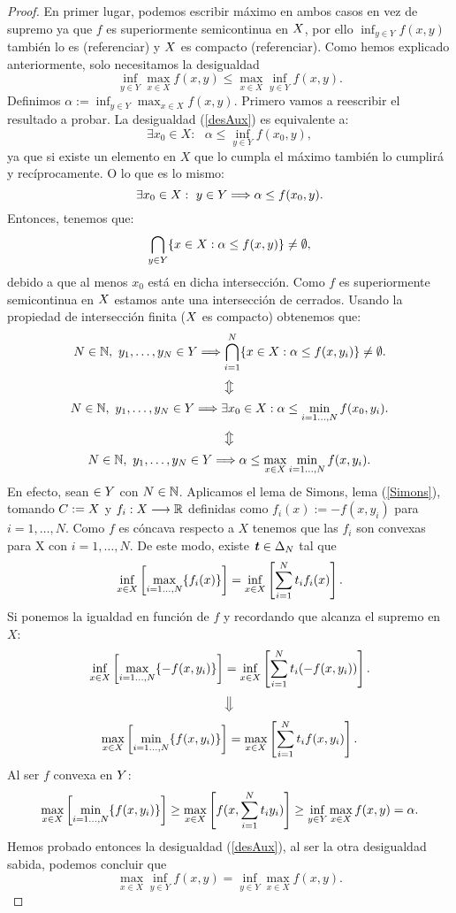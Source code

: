 \begin{proof}
En primer lugar, podemos escribir máximo en ambos casos en vez de supremo ya que $ f $ es superiormente semicontinua en $ X $, por ello $ \inf_{y \in Y} f(x,y) $ también lo es (referenciar) y $ X $ es compacto (referenciar). Como hemos explicado anteriormente, solo necesitamos la desigualdad 
\begin{equation}\label{desAux}
\inf_{y \in Y} \max_{x \in X} f(x,y) \leq \max_{x \in X} \inf_{y \in Y} f(x,y).
\end{equation}  Definimos $ \alpha := \inf_{y \in Y} \max_{x \in X} f(x,y) $. Primero vamos a reescribir el resultado a probar. La desigualdad (\ref{desAux}) es equivalente a:\\
\[
\exists x_0 \in X:\text{ }\alpha \leq \inf_{y \in Y} f(x_0,y),
\]
ya que si existe un elemento en $ X $ que lo cumpla el máximo también lo cumplirá y recíprocamente. O lo que es lo mismo:
\[
\exists x_0 \in X:\text{ }y \in Y \Longrightarrow \alpha \leq f(x_0,y).
\]
Entonces, tenemos que:
\[
\bigcap_{y\in Y}\{x \in X: \alpha \leq f(x, y) \} \neq \emptyset,
\]
debido a que al menos $ x_0 $ está en dicha intersección. Como $ f $ es superiormente semicontinua en $ X $ estamos ante una intersección de cerrados. Usando la propiedad de intersección finita ($ X $ es compacto) obtenemos que:
\[
N\in\mathbb{N}, \text{ }y_1,\dots,y_N \in Y \Longrightarrow \bigcap_{i=1}^{N}\{x \in X: \alpha \leq f(x, y_i) \} \neq \emptyset.
\]
\[
\big\Updownarrow
\]
\[
N\in\mathbb{N}, \text{ }y_1,\dots,y_N \in Y \Longrightarrow \exists x_0\in X:\alpha \leq \min_{i=1\dots,N }f(x_0,y_i).
\]
\[
\big\Updownarrow
\]
\[
N\in\mathbb{N}, \text{ }y_1,\dots,y_N \in Y \Longrightarrow \alpha \leq \max_{x \in X} \min_{i=1\dots,N }f(x,y_i).
\]
En efecto, sean $ \in Y$ con $ N \in \mathbb{N} $. Aplicamos el lema de Simons, lema (\ref{Simons}), tomando $ C := X $ y $ f_i: X \longrightarrow \mathbb{R} $ definidas como $ f_i(x):=-f(x,y_i) $ para $ i=1,\dots,N $. Como $ f $ es cóncava respecto a $ X $ tenemos que las $ f_i $ son convexas para X con $  i=1,\dots,N $. De este modo, existe $ \textbf{\emph{t}} \in \Delta_N$ tal que
\[
\inf_{x \in X}\left[ \max_{i=1\dots,N } \{f_i(x)\}\right] = \inf_{x \in X} \left[ \sum_{i=1}^{N} t_i f_i(x) \right].
\] 
Si ponemos la igualdad en función de $ f $ y recordando que alcanza el supremo en $ X $:
\[
\inf_{x \in X}\left[ \max_{i=1\dots,N } \{-f(x,y_i)\}\right] = \inf_{x \in X} \left[ \sum_{i=1}^{N} t_i (-f(x,y_i)) \right]. 
\] 
\[
\big\Downarrow
\]
\[
\max_{x \in X}\left[ \min_{i=1\dots,N } \{f(x,y_i)\}\right] = \max_{x \in X} \left[ \sum_{i=1}^{N} t_i f(x,y_i) \right]. 
\] 
Al ser $ f $ convexa en $ Y $:
\[
\max_{x \in X}\left[ \min_{i=1\dots,N } \{f(x,y_i)\}\right] \geq \max_{x \in X} \left[ f(x,\sum_{i=1}^{N} t_i y_i) \right] \geq \inf_{y \in Y} \max_{x \in X} f(x,y)= \alpha.
\]
Hemos probado entonces la desigualdad (\ref{desAux}), al ser la otra desigualdad sabida, podemos concluir que
\[
\max_{x \in X} \inf_{y \in Y} f(x,y) = \inf_{y \in Y} \max_{x \in X} f(x,y).
\]
\end{proof}
